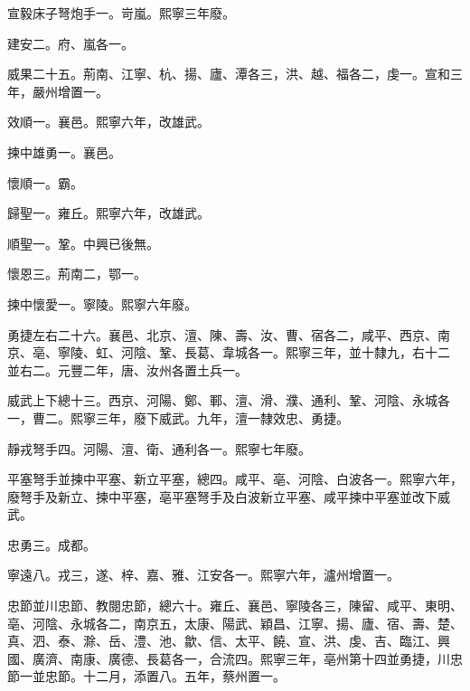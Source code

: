 \begin{pinyinscope}
 宣毅床子弩炮手一。岢嵐。熙寧三年廢。



 建安二。府、嵐各一。



 威果二十五。荊南、江寧、杭、揚、廬、潭各三，洪、越、福各二，虔一。宣和三年，嚴州增置一。



 效順一。襄邑。熙寧六年，改雄武。



 揀中雄勇一。襄邑。



 懷順一。霸。



 歸聖一。雍丘。熙寧六年，改雄武。



 順聖一。鞏。中興已後無。



 懷恩三。荊南二，鄂一。



 揀中懷愛一。寧陵。熙寧六年廢。



 勇捷左右二十六。襄邑、北京、澶、陳、壽、汝、曹、宿各二，咸平、西京、南京、亳、寧陵、虹、河陰、鞏、長葛、韋城各一。熙寧三年，並十隸九，右十二
 並右二。元豐二年，唐、汝州各置土兵一。



 威武上下總十三。西京、河陽、鄭、鄆、澶、滑、濮、通利、鞏、河陰、永城各一，曹二。熙寧三年，廢下威武。九年，澶一隸效忠、勇捷。



 靜戎弩手四。河陽、澶、衛、通利各一。熙寧七年廢。



 平塞弩手並揀中平塞、新立平塞，總四。咸平、亳、河陰、白波各一。熙寧六年，廢弩手及新立、揀中平塞，亳平塞弩手及白波新立平塞、咸平揀中平塞並改下威武。



 忠勇三。成都。



 寧遠八。戎三，遂、梓、嘉、雅、江安各一。熙寧六年，瀘州增置一。



 忠節並川忠節、教閱忠節，總六十。雍丘、襄邑、寧陵各三，陳留、咸平、東明、亳、河陰、永城各二，南京五，太康、陽武、穎昌、江寧、揚、廬、宿、壽、楚、真、泗、泰、滁、岳、澧、池、歙、信、太平、饒、宣、洪、虔、吉、臨江、興國、廣濟、南康、廣德、長葛各一，合流四。熙寧三年，亳州第十四並勇捷，川忠節一並忠節。十二月，添置八。五年，蔡州置一。




\end{pinyinscope}
